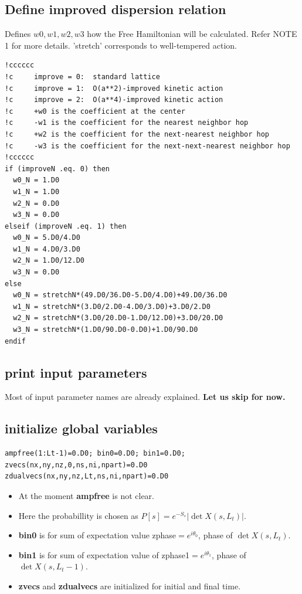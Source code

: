 \documentclass[10pt]{book}
\begin{document}
\subsection{Define improved dispersion relation} 
Defines $w0,w1,w2,w3$ how the Free Hamiltonian will be calculated. Refer NOTE 1 for more details.
'stretch' corresponds to well-tempered action.
\begin{lstlisting}[frame=single]
!cccccc
!c     improve = 0:  standard lattice 
!c     improve = 1:  O(a**2)-improved kinetic action
!c     improve = 2:  O(a**4)-improved kinetic action
!c     +w0 is the coefficient at the center
!c     -w1 is the coefficient for the nearest neighbor hop
!c     +w2 is the coefficient for the next-nearest neighbor hop
!c     -w3 is the coefficient for the next-next-nearest neighbor hop
!cccccc
if (improveN .eq. 0) then
  w0_N = 1.D0
  w1_N = 1.D0
  w2_N = 0.D0
  w3_N = 0.D0
elseif (improveN .eq. 1) then
  w0_N = 5.D0/4.D0
  w1_N = 4.D0/3.D0
  w2_N = 1.D0/12.D0
  w3_N = 0.D0
else
  w0_N = stretchN*(49.D0/36.D0-5.D0/4.D0)+49.D0/36.D0
  w1_N = stretchN*(3.D0/2.D0-4.D0/3.D0)+3.D0/2.D0
  w2_N = stretchN*(3.D0/20.D0-1.D0/12.D0)+3.D0/20.D0
  w3_N = stretchN*(1.D0/90.D0-0.D0)+1.D0/90.D0
endif
\end{lstlisting}


\subsection{print input parameters}
Most of input parameter names are already explained.  {\bf Let us skip for now.}

\subsection{initialize global variables} 
\begin{lstlisting}[frame=single]
ampfree(1:Lt-1)=0.D0; bin0=0.D0; bin1=0.D0; 
zvecs(nx,ny,nz,0,ns,ni,npart)=0.D0
zdualvecs(nx,ny,nz,Lt,ns,ni,npart)=0.D0
\end{lstlisting}
\begin{itemize}
\item At the moment {\bf ampfree} is not clear. 
\item Here the probabillity is chosen as $P[s]=e^{-S_s}|\det X(s,L_t)|$.
\item {\bf bin0} is for sum of expectation value zphase$=e^{i\theta_0}$, phase of $\det X(s,L_t)$. 
\item {\bf bin1} is for sum of expectation value of zphase1$=e^{i\theta_1}$, phase of $\det X(s,L_t-1)$.
\item {\bf zvecs} and {\bf zdualvecs} are initialized for initial and final time.      
\end{itemize}
\end{document}
